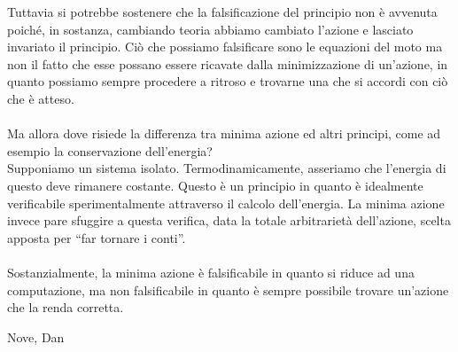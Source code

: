\documentclass[]{article}
\begin{document}
	Tuttavia si potrebbe sostenere che la falsificazione del principio non è avvenuta poiché, in sostanza, cambiando teoria abbiamo cambiato l'azione e lasciato invariato il principio. Ciò che possiamo falsificare sono le equazioni del moto ma non il fatto che esse possano essere ricavate dalla minimizzazione di un'azione, in quanto possiamo sempre procedere a ritroso e trovarne una che si accordi con ciò che è atteso.\\ 
	\\
	Ma allora dove risiede la differenza tra minima azione ed altri principi, come ad esempio la conservazione dell'energia?\\
	Supponiamo un sistema isolato. Termodinamicamente, asseriamo che l'energia di questo deve rimanere costante. Questo è un principio in quanto è idealmente verificabile sperimentalmente attraverso il calcolo dell'energia. La minima azione invece pare sfuggire a questa verifica, data la totale arbitrarietà dell'azione, scelta apposta per \enquote{far tornare i conti}.\\
	\\
	Sostanzialmente, la minima azione è falsificabile in quanto si riduce ad una computazione, ma non falsificabile in quanto è sempre possibile trovare un'azione che la renda corretta.
	
	\bigskip 
	\begin{flushright}
		Nove, Dan
	\end{flushright}
\end{document}

